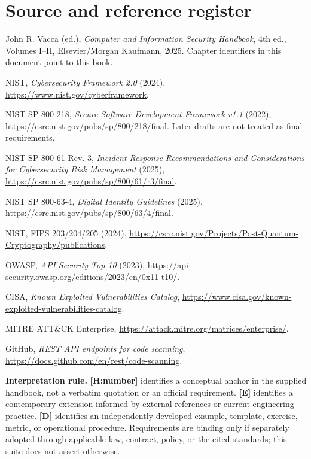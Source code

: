 \documentclass[10pt,letterpaper,oneside]{article}
\newcommand{\handbookref}[1]{\textsf{\color{accent}\textbf{[H:#1]}}}
\newcommand{\modernext}{\textsf{\color{muted}\textbf{[E]}}}
\newcommand{\designed}{\textsf{\color{accent}\textbf{[D]}}}
\begin{document}
\section*{Source and reference register}
\begin{description}[leftmargin=1.6em,style=nextline]
\item[H] John R. Vacca (ed.), \emph{Computer and Information Security Handbook}, 4th ed., Volumes I--II, Elsevier/Morgan Kaufmann, 2025. Chapter identifiers in this document point to this book.
\item[N1] NIST, \emph{Cybersecurity Framework 2.0} (2024), \url{https://www.nist.gov/cyberframework}.
\item[N2] NIST SP 800-218, \emph{Secure Software Development Framework v1.1} (2022), \url{https://csrc.nist.gov/pubs/sp/800/218/final}. Later drafts are not treated as final requirements.
\item[N3] NIST SP 800-61 Rev. 3, \emph{Incident Response Recommendations and Considerations for Cybersecurity Risk Management} (2025), \url{https://csrc.nist.gov/pubs/sp/800/61/r3/final}.
\item[N4] NIST SP 800-63-4, \emph{Digital Identity Guidelines} (2025), \url{https://csrc.nist.gov/pubs/sp/800/63/4/final}.
\item[N5] NIST, FIPS 203/204/205 (2024), \url{https://csrc.nist.gov/Projects/Post-Quantum-Cryptography/publications}.
\item[O1] OWASP, \emph{API Security Top 10} (2023), \url{https://api-security.owasp.org/editions/2023/en/0x11-t10/}.
\item[C1] CISA, \emph{Known Exploited Vulnerabilities Catalog}, \url{https://www.cisa.gov/known-exploited-vulnerabilities-catalog}.
\item[M1] MITRE ATT\&CK Enterprise, \url{https://attack.mitre.org/matrices/enterprise/}.
\item[G1] GitHub, \emph{REST API endpoints for code scanning}, \url{https://docs.github.com/en/rest/code-scanning}.
\end{description}
\begin{warningbox}\textbf{Interpretation rule.} \handbookref{number} identifies a conceptual anchor in the supplied handbook, not a verbatim quotation or an official requirement. \modernext{} identifies a contemporary extension informed by external references or current engineering practice. \designed{} identifies an independently developed example, template, exercise, metric, or operational procedure. Requirements are binding only if separately adopted through applicable law, contract, policy, or the cited standards; this suite does not assert otherwise.\end{warningbox}
\end{document}
